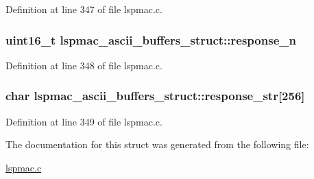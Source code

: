 Definition at line 347 of file lspmac.\-c.

\hypertarget{structlspmac__ascii__buffers__struct_a97c2fdd21eec29c2cba993e361c3c069}{
\subsubsection[{response\-\_\-n}]{\setlength{\rightskip}{0pt plus 5cm}uint16\-\_\-t lspmac\-\_\-ascii\-\_\-buffers\-\_\-struct\-::response\-\_\-n}}\label{structlspmac__ascii__buffers__struct_a97c2fdd21eec29c2cba993e361c3c069}


Definition at line 348 of file lspmac.\-c.

\hypertarget{structlspmac__ascii__buffers__struct_a32c4baecf20143eb71d348b6b5679039}{
\subsubsection[{response\-\_\-str}]{\setlength{\rightskip}{0pt plus 5cm}char lspmac\-\_\-ascii\-\_\-buffers\-\_\-struct\-::response\-\_\-str\mbox{[}256\mbox{]}}}\label{structlspmac__ascii__buffers__struct_a32c4baecf20143eb71d348b6b5679039}


Definition at line 349 of file lspmac.\-c.



The documentation for this struct was generated from the following file\-:\begin{DoxyCompactItemize}
\item 
\hyperlink{lspmac_8c}{lspmac.\-c}\end{DoxyCompactItemize}
